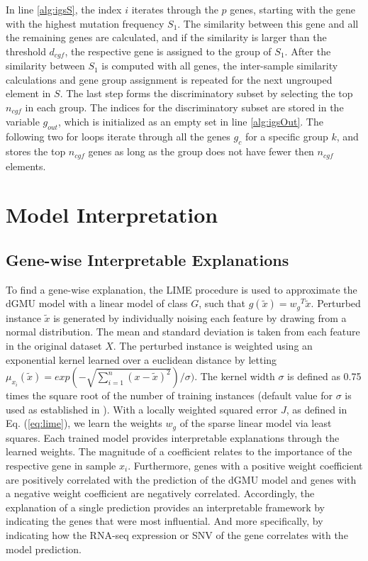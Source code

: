 \noindent
In line \ref{alg:igsS}, the index $i$ iterates through the $p$ genes, starting with the gene with the highest mutation frequency $S_1$.  The similarity between this gene and all the remaining genes are calculated, and if the similarity is larger than the threshold $d_{cgf}$, the respective gene is assigned to the group of $S_1$. After the similarity between $S_1$ is computed with all genes, the inter-sample similarity calculations and gene group assignment is repeated for the next ungrouped element in $S$. The last step forms the discriminatory subset by selecting the top $n_{cgf}$ in each group. The indices for the discriminatory subset are stored in the variable $g_{out}$, which is initialized as an empty set in line \ref{alg:igsOut}. The following two for loops iterate through all the genes $g_c$ for a specific group $k$, and stores the top $n_{cgf}$ genes as long as the group does not have fewer then $n_{cgf}$ elements.

\section{Model Interpretation}


\subsection{Gene-wise Interpretable Explanations}

To find a gene-wise explanation, the LIME procedure is used to approximate the dGMU model with a linear model of class $G$, such that $g(\tilde{x}) = {w_g}^{T} \tilde{x}$. Perturbed instance $\tilde{x}$ is generated by individually noising each feature by drawing from a normal distribution. The mean and standard deviation is taken from each feature in the original dataset $X$. The perturbed instance is weighted using an exponential kernel learned over a euclidean distance by letting $\mu_{x_i}(\tilde{x}) = exp(-\sqrt{\sum_{i=1}^{n}(x - \tilde{x})^2})/\sigma)$. The kernel width $\sigma$ is defined as 0.75 times the square root of the number of training instances (default value for $\sigma$ is used as established in \cite{ribeiro2016should}). With a locally weighted squared error $J$, as defined in Eq. (\ref{eq:lime}), we learn the weights $w_g$ of the sparse linear model via least squares. Each trained model provides interpretable explanations through the learned weights. The magnitude of a coefficient relates to the importance of the respective gene in sample $x_i$. Furthermore, genes with a positive weight coefficient are positively correlated with the prediction of the dGMU model and genes with a negative weight coefficient are negatively correlated. Accordingly, the explanation of a single prediction provides an interpretable framework by indicating the genes that were most influential. And more specifically, by indicating how the RNA-seq expression or SNV of the gene correlates with the model prediction. 


